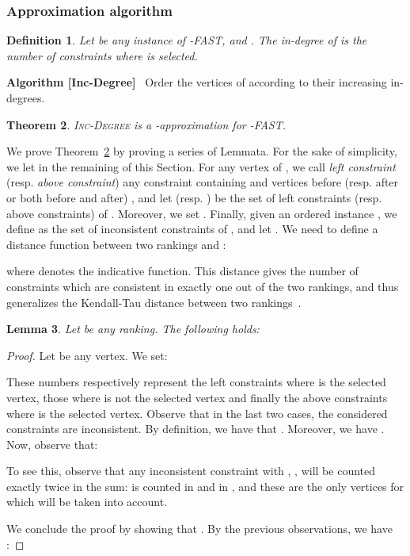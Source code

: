 \documentclass[11pt]{article}
\newtheorem{theorem}{Theorem}[section]
\newtheorem{definition}[theorem]{Definition}
\newtheorem{lemma}[theorem]{Lemma}
\begin{document}
\subsubsection{Approximation algorithm}

\begin{definition}
\label{def:indegree}
	Let  be any instance of {\sc -FAST}, and . The \emph{in-degree} of  is the number of constraints where  is selected.
\end{definition}

\noindent \textbf{Algorithm [{\sc Inc-Degree}]}~ Order the vertices of  according to their increasing in-degrees.

\begin{theorem}
\label{thm:approx}
\textsc{Inc-Degree} is a -approximation for {\sc -FAST}.
\end{theorem}

We prove Theorem~\ref{thm:approx} by proving a series of Lemmata. 
For the sake of simplicity, we let  in the remaining of this Section. For any vertex  of , we call \emph{left constraint} (resp. \emph{above constraint}) any constraint containing  and vertices before (resp. after or both before and after) , and let  (resp. ) be the set of left constraints (resp. above constraints) of . Moreover, we set . Finally, given an ordered instance 
, we define  as the set of inconsistent constraints of , and let . 
We need to define a distance function between two rankings  and :



where  denotes the indicative function. This distance gives the number of constraints which are consistent in exactly one out of the two rankings, and thus generalizes the Kendall-Tau distance between two rankings~\cite{CFR06}.

\begin{lemma}
\label{lem:approxone}
Let  be any ranking. The following holds:

\end{lemma}

\begin{proof}
Let  be any vertex. We set: 


These numbers respectively represent the left constraints where  is the selected vertex, those where  is not the selected vertex and finally the above constraints where  is the selected vertex. Observe that in the last two cases, the considered constraints are inconsistent. 
By definition, we have that . Moreover, we have . Now, observe that:

To see this, observe that any inconsistent constraint  with , , will be counted exactly twice in the sum:   is counted in  and  in , and these are the only vertices for which  will be taken into account.

We conclude the proof by showing that . By the previous observations, we have :

 \end{proof}
\end{document}
